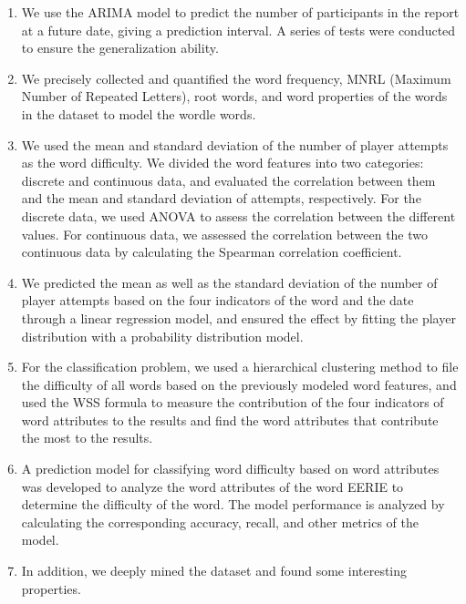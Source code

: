 \documentclass[12pt]{article}  %
\begin{document}
\begin{enumerate}[\bfseries 1.]
	\setlength{\parsep}{0ex} %
	\setlength{\topsep}{2ex} %
	\setlength{\itemsep}{1ex} %
	\item We use the ARIMA model to predict the number of participants in the report at a future date, giving a prediction interval. A series of tests were conducted to ensure the generalization ability.
	\item We precisely collected and quantified the word frequency, MNRL (Maximum Number of Repeated Letters), root words, and word properties of the words in the dataset to model the wordle words.  
	\item We used the mean and standard deviation of the number of player attempts as the word difficulty. We divided the word features into two categories: discrete and continuous data, and evaluated the correlation between them and the mean and standard deviation of attempts, respectively. For the discrete data, we used ANOVA to assess the correlation between the different values. For continuous data, we assessed the correlation between the two continuous data by calculating the Spearman correlation coefficient.  
	\item We predicted the mean as well as the standard deviation of the number of player attempts based on the four indicators of the word and the date through a linear regression model, and ensured the effect by fitting the player distribution with a probability distribution model.
	\item For the classification problem, we used a hierarchical clustering method to file the difficulty of all words based on the previously modeled word features, and used the WSS formula to measure the contribution of the four indicators of word attributes to the results and find the word attributes that contribute the most to the results.
	\item A prediction model for classifying word difficulty based on word attributes was developed to analyze the word attributes of the word EERIE to determine the difficulty of the word. The model performance is analyzed by calculating the corresponding accuracy, recall, and other metrics of the model.  
	\item In addition, we deeply mined the dataset and found some interesting properties.
\end{enumerate}


\end{document}
